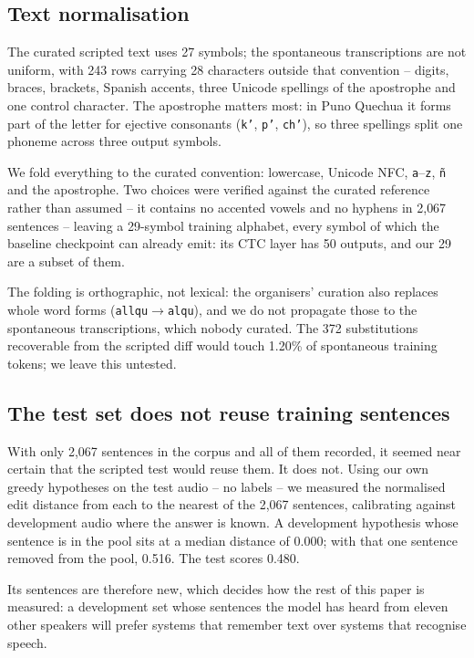 \subsection{Text normalisation}

The curated scripted text uses 27 symbols; the spontaneous transcriptions are
not uniform, with 243 rows carrying 28 characters outside that convention --
digits, braces, brackets, Spanish accents, three Unicode spellings of the
apostrophe and one control character. The apostrophe matters most: in Puno
Quechua it forms part of the letter for ejective consonants (\texttt{k'},
\texttt{p'}, \texttt{ch'}), so three spellings split one phoneme across three
output symbols.

We fold everything to the curated convention: lowercase, Unicode NFC,
\texttt{a}--\texttt{z}, \texttt{ñ} and the apostrophe. Two choices were
verified against the curated reference rather than assumed -- it contains no
accented vowels and no hyphens in 2{,}067 sentences -- leaving a 29-symbol
training alphabet, every symbol of which the baseline checkpoint can already
emit: its CTC layer has 50 outputs, and our 29 are a subset of them.

The folding is orthographic, not lexical: the organisers' curation also
replaces whole word forms (\texttt{allqu}$\rightarrow$\texttt{alqu}), and we
do not propagate those to the spontaneous transcriptions, which nobody curated.
The 372 substitutions recoverable from the scripted diff would touch 1.20\% of
spontaneous training tokens; we leave this untested.

\subsection{The test set does not reuse training sentences}
\label{sec:newsentences}

With only 2{,}067 sentences in the corpus and all of them recorded, it seemed
near certain that the scripted test would reuse them. It does not. Using our
own greedy hypotheses on the test audio -- no labels -- we measured the
normalised edit distance from each to the nearest of the 2{,}067 sentences,
calibrating against development audio where the answer is known. A development
hypothesis whose sentence is in the pool sits at a median distance of 0.000;
with that one sentence removed from the pool, 0.516. The test scores 0.480.

Its sentences are therefore new, which decides how the rest of this paper is
measured: a development set whose sentences the model has heard from eleven
other speakers will prefer systems that remember text over systems that
recognise speech.

